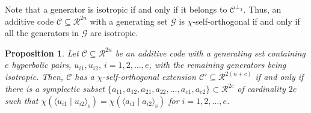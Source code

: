 \documentclass{article}
\newtheorem{prop}{Proposition}[section]
\theoremstyle{remark}
\theoremstyle{definition}
\numberwithin{equation}{section}
\begin{document}
Note that a generator is isotropic if and only if  it belongs to $\mathcal{C}^{\perp_\chi}$. Thus, an additive code $\mathcal{C} \subseteq \mathcal{R}^{2n}$ with a generating set $\mathcal{G}$ is $\chi$-self-orthogonal if and only if all the generators in $\mathcal{G}$ are isotropic.
 
 \begin{prop} \label{prop:ext}
 Let $\mathcal{C} \subseteq \mathcal{R}^{2n}$ be an additive code with a generating set containing $e$ hyperbolic pairs, $u_{i1},u_{i2}$, $i = 1,2,\ldots,e$, with the remaining generators being isotropic. Then, $\mathcal{C}$ has a $\chi$-self-orthogonal extension $\mathcal{C}'  \subseteq \mathcal{R}^{2(n+c)}$ if and only if there is a symplectic subset $\{a_{11},a_{12},a_{21},a_{22},\ldots,a_{e1},a_{e2}\} \subset \mathcal{R}^{2c}$ of cardinality $2e$ such that $\chi(\langle u_{i1} \mid u_{i2} \rangle_{\text{s}}) = \chi(\langle a_{i1} \mid a_{i2} \rangle_{\text{s}})$ for $i=1,2,\ldots,e$.
 \end{prop}
\end{document}
